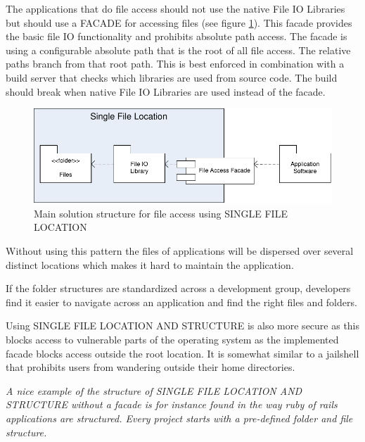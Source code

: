The applications that do file access should not use the native File IO Libraries but should use a FACADE for accessing files (see figure \ref{fig:singleFileLocationDiagram-02}). This facade provides the basic file IO functionality and prohibits absolute path access. The facade is using a configurable absolute path that is the root of all file access. The relative paths branch from that root path.  This is best enforced in combination with a build server that checks which libraries are used from source code. The build should break when native File IO Libraries are used instead of the facade.

\begin{figure}[h!]
\centering
\includegraphics{patterns/singleFileLocationDiagram-02.pdf}
\caption{Main solution structure for file access using SINGLE FILE LOCATION}
\label{fig:singleFileLocationDiagram-02}
\end{figure}

Without using this pattern the files of applications will be dispersed over several distinct locations which makes it hard to maintain the application. 

If the folder structures are standardized across a development group, developers find it easier to navigate across an application and find the right files and folders.

Using SINGLE FILE LOCATION AND STRUCTURE is also more secure as this blocks access to vulnerable parts of the operating system as the implemented facade blocks access outside the root location. It is somewhat similar to a jailshell that prohibits users from wandering outside their home directories.

\textit{A nice example of the structure of SINGLE FILE LOCATION AND STRUCTURE without a facade is for instance found in the way ruby of rails applications are structured. Every project starts with a pre-defined folder and file structure.}
 





